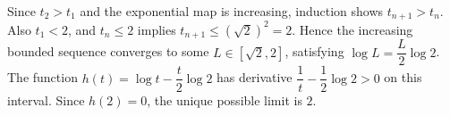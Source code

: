 Since $t_2>t_1$ and the exponential map is increasing, induction shows $t_{n+1}>t_n$. Also $t_1<2$, and $t_n\le2$ implies $t_{n+1}\le(\sqrt2)^2=2$. Hence the increasing bounded sequence converges to some $L\in[\sqrt2,2]$, satisfying $\log L=\dfrac{L}{2}\log2$. The function $h(t)=\log t-\dfrac{t}{2}\log2$ has derivative $\dfrac{1}{t}-\dfrac{1}{2}\log2>0$ on this interval. Since $h(2)=0$, the unique possible limit is $\boxed2$.
